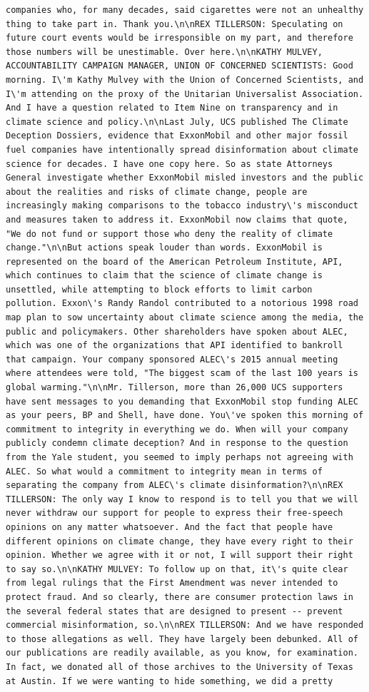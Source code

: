 \documentclass[
  letterpaper,
  DIV=11,
  numbers=noendperiod]{scrreprt}
\begin{document}
\begin{verbatim}
companies who, for many decades, said cigarettes were not an unhealthy thing to take part in. Thank you.\n\nREX TILLERSON: Speculating on future court events would be irresponsible on my part, and therefore those numbers will be unestimable. Over here.\n\nKATHY MULVEY, ACCOUNTABILITY CAMPAIGN MANAGER, UNION OF CONCERNED SCIENTISTS: Good morning. I\'m Kathy Mulvey with the Union of Concerned Scientists, and I\'m attending on the proxy of the Unitarian Universalist Association. And I have a question related to Item Nine on transparency and in climate science and policy.\n\nLast July, UCS published The Climate Deception Dossiers, evidence that ExxonMobil and other major fossil fuel companies have intentionally spread disinformation about climate science for decades. I have one copy here. So as state Attorneys General investigate whether ExxonMobil misled investors and the public about the realities and risks of climate change, people are increasingly making comparisons to the tobacco industry\'s misconduct and measures taken to address it. ExxonMobil now claims that quote, "We do not fund or support those who deny the reality of climate change."\n\nBut actions speak louder than words. ExxonMobil is represented on the board of the American Petroleum Institute, API, which continues to claim that the science of climate change is unsettled, while attempting to block efforts to limit carbon pollution. Exxon\'s Randy Randol contributed to a notorious 1998 road map plan to sow uncertainty about climate science among the media, the public and policymakers. Other shareholders have spoken about ALEC, which was one of the organizations that API identified to bankroll that campaign. Your company sponsored ALEC\'s 2015 annual meeting where attendees were told, "The biggest scam of the last 100 years is global warming."\n\nMr. Tillerson, more than 26,000 UCS supporters have sent messages to you demanding that ExxonMobil stop funding ALEC as your peers, BP and Shell, have done. You\'ve spoken this morning of commitment to integrity in everything we do. When will your company publicly condemn climate deception? And in response to the question from the Yale student, you seemed to imply perhaps not agreeing with ALEC. So what would a commitment to integrity mean in terms of separating the company from ALEC\'s climate disinformation?\n\nREX TILLERSON: The only way I know to respond is to tell you that we will never withdraw our support for people to express their free-speech opinions on any matter whatsoever. And the fact that people have different opinions on climate change, they have every right to their opinion. Whether we agree with it or not, I will support their right to say so.\n\nKATHY MULVEY: To follow up on that, it\'s quite clear from legal rulings that the First Amendment was never intended to protect fraud. And so clearly, there are consumer protection laws in the several federal states that are designed to present -- prevent commercial misinformation, so.\n\nREX TILLERSON: And we have responded to those allegations as well. They have largely been debunked. All of our publications are readily available, as you know, for examination. In fact, we donated all of those archives to the University of Texas at Austin. If we were wanting to hide something, we did a pretty 
\end{verbatim}
\end{document}
